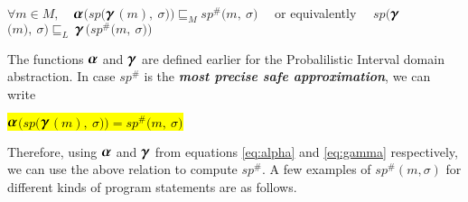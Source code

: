 \documentclass[final,3p, review, times]{util/elsarticle}
\newcommand{\ALPHA}{\large\boldsymbol{\alpha}\normalsize}
\newcommand{\GAMMA}{\large\boldsymbol{\gamma}\normalsize}
\begin{document}
\centerline{
$\forall m\in M,\quad$$\ALPHA$$\Big(sp\big($$\GAMMA$$(m),\ \sigma\big)\Big)\sqsubseteq_M sp^\#\big(m,\ \sigma\big)\quad$ or equivalently $\quad sp\Big($$\GAMMA$$\big(m\big),\ \sigma\Big)\sqsubseteq_L\ $$\GAMMA$$\Big(sp^\#\big(m,\ \sigma\big)\Big)$
}

The functions $\ALPHA$ and $\GAMMA$ are defined earlier for the Probalilistic Interval domain abstraction. In case $sp^\#$ is the \textbf{\textit{most precise safe approximation}}, we can write

\centerline{
\hl{$\ALPHA$$\Big(sp\big($$\GAMMA$$(m),\ \sigma\big)\Big)=sp^\#\big(m,\ \sigma\big)$}
}
Therefore, using $\ALPHA$ and $\GAMMA$ from equations \ref{eq:alpha} and \ref{eq:gamma} respectively, we can use the above relation to compute $sp^\#$. A few examples of $sp^\#(m,\sigma)$ for different kinds of program statements are as follows.
\end{document}
